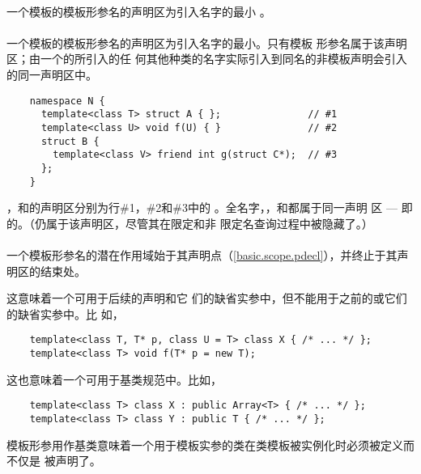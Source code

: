 \paragraph{} %
一个模板的模板形参名的声明区为引入名字的最小
。

\paragraph{} %
一个模板的模板形参名的声明区为引入名字的最小。只有模板
形参名属于该声明区；由一个的所引入的任
何其他种类的名字实际引入到同名的非模板声明会引入的同一声明区中。

\begin{example} %
  \begin{lstlisting}
    namespace N {
      template<class T> struct A { };               // #1
      template<class U> void f(U) { }               // #2
      struct B {
        template<class V> friend int g(struct C*);  // #3
      };
    }
  \end{lstlisting}
  ，和的声明区分别为行\#1，\#2和\#3中的
  。全名字，，和都属于同一声明
  区 --- 即的。（仍属于该声明区，尽管其在限定和非
  限定名查询过程中被隐藏了。）
\end{example}

\paragraph{} %
一个模板形参名的潜在作用域始于其声明点（\ref{basic.scope.pdecl}），并终止于其声
明区的结束处。

\begin{note} %
  这意味着一个可用于后续的声明和它
  们的缺省实参中，但不能用于之前的或它们的缺省实参中。比
  如，
  \begin{lstlisting}
    template<class T, T* p, class U = T> class X { /* ... */ };
    template<class T> void f(T* p = new T);
  \end{lstlisting}
  这也意味着一个可用于基类规范中。比如，
  \begin{lstlisting}
    template<class T> class X : public Array<T> { /* ... */ };
    template<class T> class Y : public T { /* ... */ };
  \end{lstlisting}
  模板形参用作基类意味着一个用于模板实参的类在类模板被实例化时必须被定义而不仅是
  被声明了。
\end{note}

